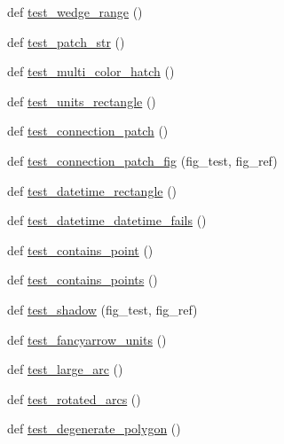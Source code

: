 \begin{DoxyCompactItemize}
\item 
def \hyperlink{namespacematplotlib_1_1tests_1_1test__patches_a7bde65cb039c781978b8df1a2ba719d3}{test\+\_\+wedge\+\_\+range} ()
\item 
def \hyperlink{namespacematplotlib_1_1tests_1_1test__patches_a3e72b43ef6f0ed01d7d1d1ade480095f}{test\+\_\+patch\+\_\+str} ()
\item 
def \hyperlink{namespacematplotlib_1_1tests_1_1test__patches_a936eb3a491ae4bfc9dd16734335e3218}{test\+\_\+multi\+\_\+color\+\_\+hatch} ()
\item 
def \hyperlink{namespacematplotlib_1_1tests_1_1test__patches_a195dd7c745867ee891fe2dad340f0cec}{test\+\_\+units\+\_\+rectangle} ()
\item 
def \hyperlink{namespacematplotlib_1_1tests_1_1test__patches_afe36db6b4a8faf3d15d550e453bb2e23}{test\+\_\+connection\+\_\+patch} ()
\item 
def \hyperlink{namespacematplotlib_1_1tests_1_1test__patches_a0438204a7f28a4c52e4b8e3f54150dd6}{test\+\_\+connection\+\_\+patch\+\_\+fig} (fig\+\_\+test, fig\+\_\+ref)
\item 
def \hyperlink{namespacematplotlib_1_1tests_1_1test__patches_abd52c01786dfc1dcae70d59c3846cadd}{test\+\_\+datetime\+\_\+rectangle} ()
\item 
def \hyperlink{namespacematplotlib_1_1tests_1_1test__patches_aca333410520af46334eec535064689bf}{test\+\_\+datetime\+\_\+datetime\+\_\+fails} ()
\item 
def \hyperlink{namespacematplotlib_1_1tests_1_1test__patches_a0c6a7aa408a804dae169bb7a70f18130}{test\+\_\+contains\+\_\+point} ()
\item 
def \hyperlink{namespacematplotlib_1_1tests_1_1test__patches_ab61598721f204aa8dccbfefeba9d341c}{test\+\_\+contains\+\_\+points} ()
\item 
def \hyperlink{namespacematplotlib_1_1tests_1_1test__patches_aa14987fac80344e4abc381e0abc73087}{test\+\_\+shadow} (fig\+\_\+test, fig\+\_\+ref)
\item 
def \hyperlink{namespacematplotlib_1_1tests_1_1test__patches_a040ba637dd58816a8770a692854fe9d3}{test\+\_\+fancyarrow\+\_\+units} ()
\item 
def \hyperlink{namespacematplotlib_1_1tests_1_1test__patches_aee6c3a2617150b113b275893de4db375}{test\+\_\+large\+\_\+arc} ()
\item 
def \hyperlink{namespacematplotlib_1_1tests_1_1test__patches_a8b42e067bc3953d58f80bdd2aec707cb}{test\+\_\+rotated\+\_\+arcs} ()
\item 
def \hyperlink{namespacematplotlib_1_1tests_1_1test__patches_a4a11f8adef2ce8a73cbb3fb64f456c7a}{test\+\_\+degenerate\+\_\+polygon} ()

\end{DoxyCompactItemize}
